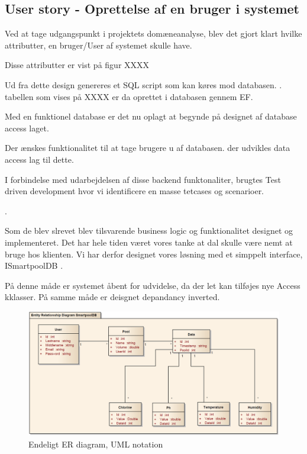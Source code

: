 \subsection{User story - Oprettelse af en bruger i systemet}

Ved at tage udgangspunkt i projektets domæneanalyse, blev det gjort klart hvilke attributter, en bruger/User af systemet skulle have.

Disse attributter er vist på figur XXXX


Ud fra dette design genereres et SQL script som kan køres mod databasen. . tabellen som vises på XXXX er da oprettet i databasen gennem EF.

Med en funktionel database er det nu oplagt at begynde på designet af database access laget.

Der ænskes funktionalitet til at tage brugere u af databasen. der udvikles data access lag til dette.

I forbindelse med udarbejdelsen af disse backend funktonaliter, brugtes Test driven development hvor vi identificere en masse tetcases og scenarioer.

.

Som de blev slrevet blev tilsvarende business logic og funktionalitet designet og implementeret.
Det har hele tiden været vores tanke at dal skulle være nemt at bruge hos klienten. Vi har derfor designet vores løsning med et simppelt interface, ISmartpoolDB .

På denne måde er systemet åbent for udvidelse, da der let kan tilføjes nye Access kklasser. På samme måde er deisgnet depandancy inverted.

\begin{figure}[h]
	\centering
	\includegraphics[width=\linewidth]{figs/design/databaseERD_final_uml}
	\caption{Endeligt ER diagram, UML notation}
	\label{fig:databaseERD_final_uml}
\end{figure}

